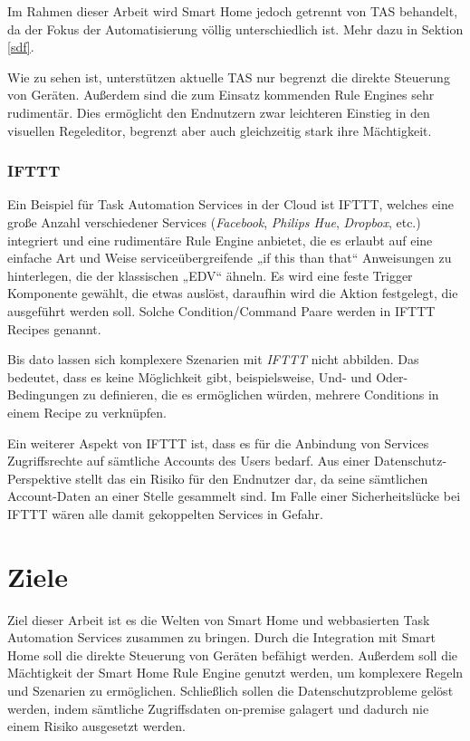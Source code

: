 Im Rahmen dieser Arbeit wird Smart Home jedoch getrennt von TAS behandelt, da der Fokus der Automatisierung völlig unterschiedlich ist. Mehr dazu in Sektion \ref{sdf}.

Wie zu sehen ist, unterstützen aktuelle TAS nur begrenzt die direkte Steuerung von Geräten. Außerdem sind die zum Einsatz kommenden Rule Engines sehr rudimentär. Dies ermöglicht den Endnutzern zwar leichteren Einstieg in den visuellen Regeleditor, begrenzt aber auch gleichzeitig stark ihre Mächtigkeit. 

\subsubsection{IFTTT}
Ein Beispiel für Task Automation Services in der Cloud ist IFTTT, welches eine große Anzahl verschiedener Services (\textit{Facebook}, \textit{Philips Hue}, \textit{Dropbox}, etc.) integriert und eine rudimentäre Rule Engine anbietet, die es erlaubt auf eine einfache Art und Weise serviceübergreifende „if this than that“ Anweisungen zu hinterlegen, die der klassischen „EDV“ ähneln. Es wird eine feste Trigger Komponente gewählt, die etwas auslöst, daraufhin wird die Aktion festgelegt, die ausgeführt werden soll. Solche Condition/Command Paare werden in IFTTT Recipes genannt. 

Bis dato lassen sich komplexere Szenarien mit \textit{IFTTT} nicht abbilden.  Das bedeutet, dass es keine Möglichkeit gibt, beispielsweise, Und- und Oder-Bedingungen zu definieren, die es ermöglichen würden, mehrere Conditions in einem Recipe zu verknüpfen.

Ein weiterer Aspekt von IFTTT ist, dass es für die Anbindung von Services Zugriffsrechte auf sämtliche Accounts des Users bedarf. Aus einer Datenschutz-Perspektive stellt das ein Risiko für den Endnutzer dar, da seine sämtlichen Account-Daten an einer Stelle gesammelt sind. Im Falle einer Sicherheitslücke bei IFTTT wären alle damit gekoppelten Services in Gefahr. 

\section{Ziele}
\label{sec:ziele}
Ziel dieser Arbeit ist es die Welten von Smart Home und webbasierten Task Automation Services zusammen zu bringen. Durch die Integration mit Smart Home soll die direkte Steuerung von Geräten befähigt werden. Außerdem soll die Mächtigkeit der Smart Home Rule Engine genutzt werden, um komplexere Regeln und Szenarien zu ermöglichen. Schließlich sollen die Datenschutzprobleme gelöst werden, indem sämtliche Zugriffsdaten on-premise galagert und dadurch nie einem Risiko ausgesetzt werden.

